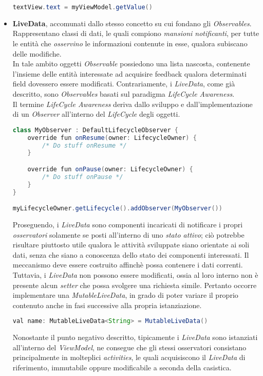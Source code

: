 \documentclass{article}
\begin{document}
\begin{itemize}[label = {-}]
\begin{lstlisting}[language = JAVA]
textView.text = myViewModel.getValue()
    \end{lstlisting}
    \item \textbf{LiveData}, accomunati dallo stesso concetto su cui fondano gli \textit{Observables}. Rappresentano classi di dati, le quali compiono \textit{mansioni notificanti}, per tutte le entità che \textit{osservino} le informazioni contenute in esse, qualora subiscano delle modifiche.\vspace*{7pt}\\
    In tale ambito oggetti \textit{Observable} possiedono una lista nascosta, contenente l'insieme delle entità interessate ad acquisire feedback qualora determinati field dovessero essere modificati. Contrariamente, i \textit{LiveData}, come già descritto, sono \textit{Observables} basati sul paradigma \textit{LifeCycle Awareness}.\vspace*{7pt}\\
    Il termine \textit{LifeCycle Awareness} deriva dallo sviluppo e dall'implementazione di un \textit{Observer} all'interno del \textit{LifeCycle} degli oggetti.
    \begin{lstlisting}[language = JAVA]
class MyObserver : DefaultLifecycleObserver {
    override fun onResume(owner: LifecycleOwner) {
        /* Do stuff onResume */
    }

    override fun onPause(owner: LifecycleOwner) {
        /* Do stuff onPause */
    }
}

myLifecycleOwner.getLifecycle().addObserver(MyObserver())
    \end{lstlisting}
    Proseguendo, i \textit{LiveData} sono componenti incaricati di notificare i propri \textit{osservatori} solamente se posti all'interno di uno \textit{stato attivo}; ciò potrebbe risultare piuttosto utile qualora le attività sviluppate siano orientate ai soli dati, senza che siano a conoscenza dello stato dei componenti interessati. Il meccanismo deve essere costruito affinchè possa contenere i dati correnti.\vspace*{7pt}\\
    Tuttavia, i \textit{LiveData} non possono essere modificati, ossia al loro interno non è presente alcun \textit{setter} che possa svolgere una richiesta simile. Pertanto occorre implementare una \textit{MutableLiveData}, in grado di poter variare il proprio contenuto anche in fasi successive alla propria istanziazione.
    \begin{lstlisting}[language = JAVA]
val name: MutableLiveData<String> = MutableLiveData() 
    \end{lstlisting}
    Nonostante il punto negativo descritto, tipicamente i \textit{LiveData} sono istanziati all'interno del \textit{ViewModel}, ne consegue che gli stessi osservatori consistano principalmente in molteplici \textit{activities}, le quali acquisiscono il \textit{LiveData} di riferimento, immutabile oppure modificabile a seconda della casistica.
\end{itemize} 
\end{document}
